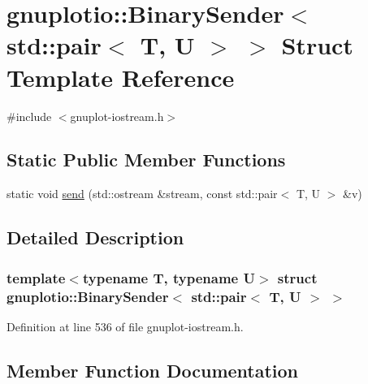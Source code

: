 \hypertarget{structgnuplotio_1_1_binary_sender_3_01std_1_1pair_3_01_t_00_01_u_01_4_01_4}{}\section{gnuplotio\+:\+:Binary\+Sender$<$ std\+:\+:pair$<$ T, U $>$ $>$ Struct Template Reference}
\label{structgnuplotio_1_1_binary_sender_3_01std_1_1pair_3_01_t_00_01_u_01_4_01_4}


{\ttfamily \#include $<$gnuplot-\/iostream.\+h$>$}

\subsection*{Static Public Member Functions}
\begin{DoxyCompactItemize}
\item 
static void \hyperlink{structgnuplotio_1_1_binary_sender_3_01std_1_1pair_3_01_t_00_01_u_01_4_01_4_a9d949c8e7b1dea493288b0a2dd95cbff}{send} (std\+::ostream \&stream, const std\+::pair$<$ T, U $>$ \&v)
\end{DoxyCompactItemize}


\subsection{Detailed Description}
\subsubsection*{template$<$typename T, typename U$>$\newline
struct gnuplotio\+::\+Binary\+Sender$<$ std\+::pair$<$ T, U $>$ $>$}



Definition at line 536 of file gnuplot-\/iostream.\+h.



\subsection{Member Function Documentation}
\mbox{\label{structgnuplotio_1_1_binary_sender_3_01std_1_1pair_3_01_t_00_01_u_01_4_01_4_a9d949c8e7b1dea493288b0a2dd95cbff}} 
